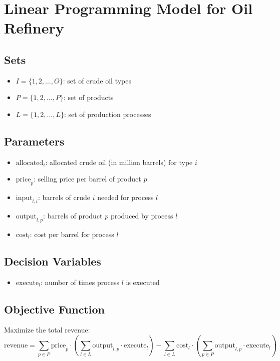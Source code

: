 \documentclass{article}
\begin{document}
\section*{Linear Programming Model for Oil Refinery}

\subsection*{Sets}
\begin{itemize}
    \item \( I = \{1, 2, \ldots, O\} \): set of crude oil types
    \item \( P = \{1, 2, \ldots, P\} \): set of products
    \item \( L = \{1, 2, \ldots, L\} \): set of production processes
\end{itemize}

\subsection*{Parameters}
\begin{itemize}
    \item \( \text{allocated}_i \): allocated crude oil (in million barrels) for type \( i \)
    \item \( \text{price}_p \): selling price per barrel of product \( p \)
    \item \( \text{input}_{l,i} \): barrels of crude \( i \) needed for process \( l \)
    \item \( \text{output}_{l,p} \): barrels of product \( p \) produced by process \( l \)
    \item \( \text{cost}_l \): cost per barrel for process \( l \)
\end{itemize}

\subsection*{Decision Variables}
\begin{itemize}
    \item \( \text{execute}_l \): number of times process \( l \) is executed
\end{itemize}

\subsection*{Objective Function}
Maximize the total revenue:
\[
\text{revenue} = \sum_{p \in P} \text{price}_p \cdot \left( \sum_{l \in L} \text{output}_{l,p} \cdot \text{execute}_l \right) - \sum_{l \in L} \text{cost}_l \cdot \left( \sum_{p \in P} \text{output}_{l,p} \cdot \text{execute}_l \right)
\]
\end{document}
